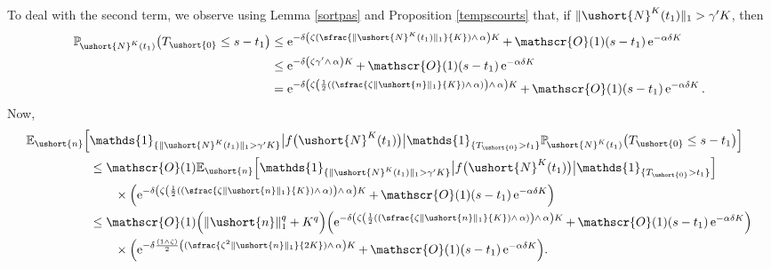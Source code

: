 \documentclass[JEP,XML,SOM,Unicode]{cedram}
\newcommand{\Psfrac}[2]{(\sfrac{#1}{#2})}
\let\mathcal\mathscr
\numberwithin{equation}{section}
\theoremstyle{plain}
\theoremstyle{definition}
\newcommand{\proba}{{\mathbb{P}}}
\newcommand{\E}{{\mathbb{E}}}
\newcommand{\Oun}{\mathcal{O}(1)}
\newcommand{\un}{\mathds{1}}
\newcommand{\vecn}{\ushort{n}}
\newcommand{\veczer}{\ushort{0}}
\newcommand{\leproc}{\ushort{N}^{K}}
\newcommand{\sleproc}{\ushort{N}^{K}}
\newcommand{\e}{\operatorname{e}}
\newcommand{\norm}[1]{\|#1\|_{1}}\let\snorm\norm
\begin{document}
To deal with the second term, we observe using Lemma \ref{sortpas} and Proposition \ref{tempscourts} that,
if $\|\leproc(t_{1})\|_1> \gamma' K$, then
\begin{align*}
\proba_{\!\sleproc(t_{1})}\bigl(T_{\veczer}\le s-t_{1}\bigr)
& \le \e^{-\delta\left(\zeta\Psfrac{\|\sleproc(t_{1})\|_{1}}{K}\wedge\,\alpha\right)K}+\,\Oun (s-t_{1})\e^{-\alpha\delta K}\\
& \leq \e^{-\delta\left(\zeta\gamma'\wedge\,\alpha\right)K}+\,\Oun (s-t_{1})\e^{-\alpha\delta K}\\
& =\e^{-\delta\left(\zeta\left(\frac{1}{2} \left(\Psfrac{\zeta \|\vecn\|_{1}}{K} \wedge\, \alpha \right)\right)\wedge\,\alpha\right)K}+\,\Oun (s-t_{1})\e^{-\alpha\delta K}.
\end{align*}
Now,
\begin{align*}
\E_{\vecn}\Bigl[&\un_{\{\|\sleproc(t_{1})\|_1> \gamma' K\}}
\big|f\bigl(\leproc(t_{1})\bigr)\big|\un_{\{T_{\veczer}>t_{1}\}}
\proba_{\!\sleproc(t_{1})}\bigl(T_{\veczer}\le s-t_{1}\bigr)\Bigr]\\
& \leq \Oun \E_{\vecn}\Bigl[\un_{\{\|\sleproc(t_{1})\|_1> \gamma' K\}}
\big|f\bigl(\leproc(t_{1})\bigr)\big|\un_{\{T_{\veczer}>t_{1}\}}
\Bigr]\\
& \qquad\times \Bigl(\e^{-\delta\left(\zeta\left(\frac{1}{2} \left(\Psfrac{\zeta \|\vecn\|_{1}}{K} \wedge\, \alpha\right)\right)
\wedge\,\alpha\right)K}+\,\Oun (s-t_{1})\e^{-\alpha\delta K}\Bigr)\\
& \leq \Oun \Bigl(\norm{\vecn}^{q}+K^{q}\Bigr) \Bigl(\e^{-\delta\left(\zeta\left(\frac{1}{2} \left(\Psfrac{\zeta \|\vecn\|_{1}}{K}
\wedge\, \alpha\right)\right)\wedge\,\alpha\right)K}+\,\Oun (s-t_{1})\e^{-\alpha\delta K}\Bigr)\\
&
\qquad \times \Bigl(\e^{-\delta \frac{(1\wedge \zeta)}{2} \left(\Psfrac{\zeta^2 \|\vecn\|_{1}}{2K} \wedge\, \alpha\right)K}+\,
\Oun (s-t_{1})\e^{-\alpha\delta K}\Bigr).
\end{align*}
\end{document}
